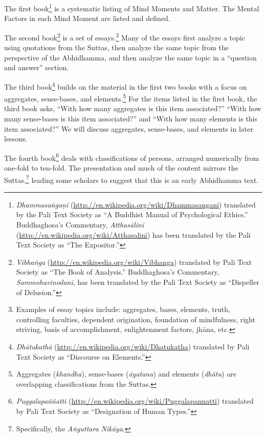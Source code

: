 The first book\footnote{\textit{Dhammasaṅgaṇī} (\url{http://en.wikipedia.org/wiki/Dhammasangani}) translated by the Pali Text Society as “A Buddhist Manual of Psychological Ethics.” Buddhaghosa’s Commentary, \textit{Atthasālinī} (\url{http://en.wikipedia.org/wiki/Atthasalini}) has been translated by the Pali Text Society as “The Expositor.”} is a systematic listing of Mind Moments and Matter. The Mental Factors in each Mind Moment are listed and defined. 

The second book\footnote{\textit{Vibhaṅga} (\url{http://en.wikipedia.org/wiki/Vibhanga}) translated by Pali Text Society as “The Book of Analysis.” Buddhaghosa’s Commentary, \textit{Sammohavinodanī}, has been translated by the Pali Text Society as “Dispeller of Delusion.”} is a set of essays.\footnote{Examples of essay topics include: aggregates, bases, elements, truth, controlling faculties, dependent origination, foundation of mindfulness, right striving, basis of accomplishment, enlightenment factors, jhāna, etc.} Many of the essays first analyze a topic using quotations from the Suttas, then analyze the same topic from the perspective of the Abhidhamma, and then analyze the same topic in a “question and answer” section.

\pagebreak

The third book\footnote{\textit{Dhātukathā} (\url{http://en.wikipedia.org/wiki/Dhatukatha}) translated by Pali Text Society as “Discourse on Elements.”} builds on the material in the first two books with a focus on aggregates, sense-bases, and elements.\footnote{Aggregates (\textit{khandha}), sense-bases (\textit{āyatana}) and elements (\textit{dhātu}) are overlapping classifications from the Suttas.} For the items listed in the first book, the third book asks, “With how many aggregates is this item associated?” “With how many sense-bases is this item associated?” and “With how many elements is this item associated?” We will discuss aggregates, sense-bases, and elements in later lessons.

The fourth book\footnote{\textit{Puggalapaññatti} (\url{http://en.wikipedia.org/wiki/Puggalapannatti}) translated by Pali Text Society as “Designation of Human Types.”} deals with classifications of persons, arranged numerically from one-fold to ten-fold. The presentation and much of the content mirrors the Suttas,\footnote{Specifically, the \textit{Aṅguttara Nikāya}.} leading some scholars to suggest that this is an early Abhidhamma text.

